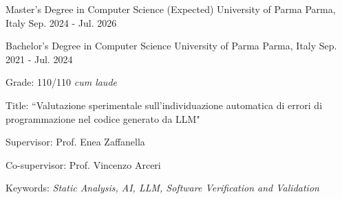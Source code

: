 

\begin{cventries}

	\cventry
		{Master's Degree in Computer Science (Expected)} %
		{University of Parma} %
		{Parma, Italy} %
		{Sep. 2024 - Jul. 2026} %
		{
		}
	
  \cventry
    {Bachelor's Degree in Computer Science} %
    {University of Parma} %
    {Parma, Italy} %
    {Sep. 2021 - Jul. 2024} %
    {
			\begin{cvitems-no-bullet} %
				\item {Grade: 110/110 \emph{cum laude}}
				\item {Title: ``Valutazione sperimentale sull’individuazione automatica di errori di programmazione nel codice generato da LLM"}
				\item {Supervisor: Prof. Enea Zaffanella}
				\item {Co-supervisor: Prof. Vincenzo Arceri}
				\item {Keywords: \emph{Static Analysis, AI, LLM, Software Verification and Validation}}
      \end{cvitems-no-bullet}
    }

\end{cventries}
